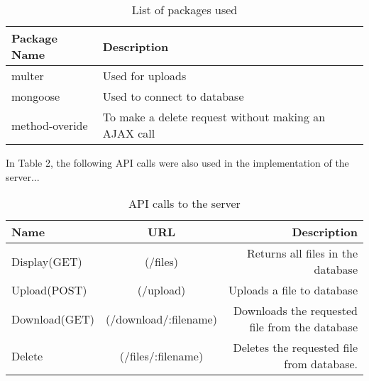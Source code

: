 \documentclass{article}
\begin{document}
\begin{table}[h!]
\begin {center}
\captionsetup{justification=centering}
\caption{List of packages used}
\begin{tabular}{| l | l |}
\hline
\textbf{Package Name} & \textbf{Description}\\
\hline
multer & Used for uploads\\
\hline
mongoose & Used to connect to database\\
\hline
method-overide & To make a delete request without making an AJAX call\\
\hline
\end{tabular}
\end{center}
\end{table}

In Table 2, the following API calls were also used in the implementation of the server...
\begin{table}[h!]
\begin {center}
\captionsetup{justification=centering}
\caption{API calls to the server}
\begin{tabular}{| l | c | r |}
\hline
\textbf{Name} & \textbf{URL} & \textbf{Description}\\
\hline
Display(GET) & (/files) & Returns all files in the database\\
\hline
Upload(POST) & (/upload) & Uploads a file to database\\
\hline
Download(GET) & (/download/:filename) & Downloads the requested file from the database\\
\hline
Delete & (/files/:filename)  & Deletes the requested file from database.\\
\hline
\end{tabular}
\end{center}
\end{table}
\end{document}
